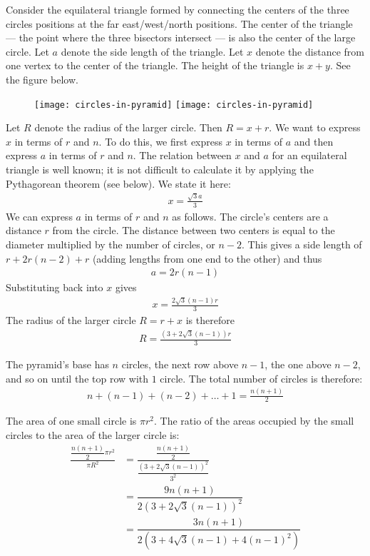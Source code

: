 Consider the equilateral triangle formed by connecting the centers of the three circles positions at the far east/west/north positions. The center of the triangle --- the point where the three bisectors intersect --- is also the center of the large circle. Let $a$ denote the side length of the triangle. Let $x$ denote the distance from one vertex to the center of the triangle. The height of the triangle is $x+y$. See the figure below. 
\begin{figure}[H]
\centering
\texttt{[image: circles-in-pyramid]}%
\texttt{[image: circles-in-pyramid]}
\end{figure}
Let $R$ denote the radius of the larger circle. Then $R=x+r$. We want to express $x$ in terms of $r$ and $n$. To do this, we first express $x$ in terms of $a$ and then express $a$ in terms of $r$ and $n$. The relation between $x$ and $a$ for an equilateral triangle is well known; it is not difficult to calculate it by applying the Pythagorean theorem (see below). We state it here: 
\begin{align*}
x = \frac{\sqrt{3}a}{3}
\end{align*}
We can express $a$ in terms of $r$ and $n$ as follows. The circle's centers are a distance $r$ from the circle. The distance between two centers is equal to the diameter multiplied by the number of circles, or $n-2$. This gives a side length of $r + 2r(n-2) + r$ (adding lengths from one end to the other) and thus
\begin{align*}
a =  2r(n-1)
\end{align*}
Substituting back into $x$ gives
\begin{align*}
x = \frac{2\sqrt{3}(n-1)r}{3}
\end{align*}
The radius of the larger circle $R=r+x$ is therefore 
\begin{align*}
R = \frac{\left(3+2\sqrt{3}(n-1)\right)r}{3}
\end{align*}

The pyramid's base has $n$ circles, the next row above $n-1$, the one above $n-2$, and so on until the top row with $1$ circle. The total number of circles is therefore:
\begin{align*}
n + (n-1) + (n-2) + \ldots + 1
  = \frac{n(n+1)}{2}
\end{align*}

The area of one small circle is $\pi r^2$. The ratio of the areas occupied by the small circles to the area of the larger circle is:
\begin{align*}
\frac{\dfrac{n(n+1)}{2} \pi r^2}{\pi R^2}
 & = 
\frac{\dfrac{n(n+1)}{2}}{\dfrac{\left(3+2\sqrt{3}(n-1)\right)^2}{3^2}}\\[1em]
 & = 
\dfrac{9n(n+1)}{2\left(3+2\sqrt{3}(n-1)\right)^2}\\[1em]
 & = 
\dfrac{3n(n+1)}{2\left(3+4\sqrt{3}(n-1)+4(n-1)^2\right)}
\end{align*}


